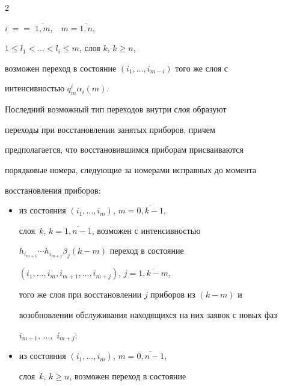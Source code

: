 \begin{multicols}{2}
\begin{itemize}
$i\;=$\linebreak $=\;\overline{1,m}$,\ \ $m=\overline{1,n}$,


$1\le l_1<\ldots<l_i\le m$, слоя $k$, $k\ge n$,


возможен переход в состояние $(i_1,\ldots, i_{m-i})$ того же слоя с


интенсивностью $q^i_m\alpha_i(m)$.


\end{itemize}





Последний возможный тип переходов внутри слоя образуют


переходы при восстановлении занятых приборов, причем


предполагается, что восстановившимся приборам присваиваются


порядковые номера, следующие за номерами исправных до момента


восстановления приборов:


\begin{itemize}


\item из состояния $(i_1,\ldots, i_m)$, $m=\overline{0,k-1}$,


слоя~$k$, $k=\overline{1,n-1}$, возможен с интенсивностью


$h_{i_{m+1}}\cdots h_{i_{m+j}}\beta_j(k-m)$ переход в состояние


$(i_1,\ldots,i_{m},i_{m+1},\ldots,i_{m+j})$, $j=\overline{1,k-m}$,


того же слоя при восстановлении $j$ приборов из $(k-m)$ и


возобновлении обслуживания находящихся на них заявок с новых фаз


$i_{m+1},\,\ldots,$ $i_{m+j}$;


\item












из состояния $(i_1,\ldots, i_m)$, $m=\overline{0,n-1}$,


слоя~$k$, $k\ge n$, возможен переход в состояние



\end{itemize}
\end{multicols}
